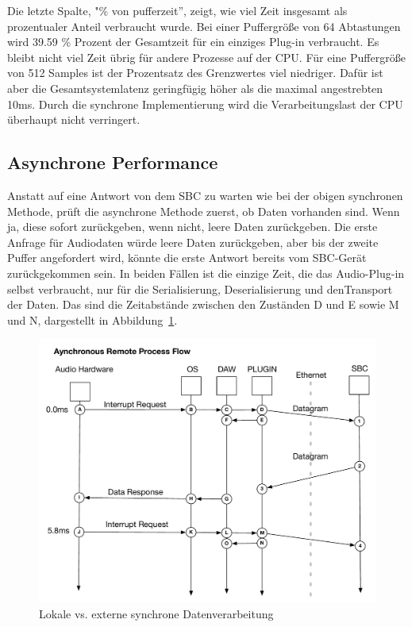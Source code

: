 Die letzte Spalte, "\% von pufferzeit”, zeigt, wie viel Zeit insgesamt als prozentualer Anteil verbraucht wurde. Bei einer Puffergröße von 64 Abtastungen wird 39.59 \% Prozent der Gesamtzeit für ein einziges Plug-in verbraucht. Es bleibt nicht viel Zeit übrig für andere Prozesse auf der CPU. Für eine Puffergröße von 512 Samples ist der Prozentsatz des Grenzwertes viel niedriger. Dafür ist aber die Gesamtsystemlatenz geringfügig höher als die maximal angestrebten 10ms. Durch die synchrone Implementierung wird die Verarbeitungslast der CPU überhaupt nicht verringert.


\subsection{Asynchrone Performance}

Anstatt auf eine Antwort von dem SBC zu warten wie bei der obigen synchronen Methode, prüft die asynchrone Methode zuerst, ob Daten vorhanden sind. Wenn ja,   diese sofort zurückgeben, wenn nicht, leere Daten zurückgeben. Die erste Anfrage für Audiodaten würde leere Daten zurückgeben, aber bis der zweite Puffer angefordert wird, könnte die erste Antwort bereits vom SBC-Gerät zurückgekommen sein. In beiden Fällen ist die einzige Zeit, die das Audio-Plug-in selbst verbraucht, nur für die Serialisierung, Deserialisierung und denTransport der Daten. Das sind die Zeitabstände zwischen den Zuständen D und E sowie M und N, dargestellt in Abbildung~\ref{fig:async_remote}.

\begin{figure}[H]
    \centering
    \includegraphics[width=\textwidth]{assets/conclusion/async_flow.pdf}
    \caption{Lokale vs. externe synchrone Datenverarbeitung}
    \label{fig:async_remote}
\end{figure}

